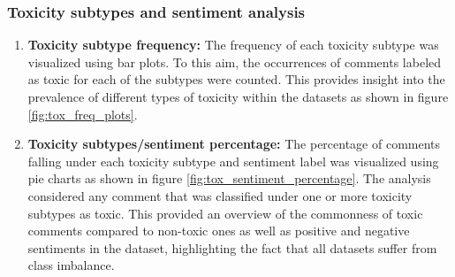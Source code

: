 \subsubsection{Toxicity subtypes and sentiment analysis}

\begin{enumerate}
    \item \textbf{Toxicity subtype frequency:} The frequency of each toxicity subtype was visualized using bar plots. To this aim, the occurrences of comments labeled as toxic for each of the subtypes were counted. This provides insight into the prevalence of different types of toxicity within the datasets as shown in figure \ref{fig:tox_freq_plots}.
    \item \textbf{Toxicity subtypes/sentiment percentage:} The percentage of comments falling under each toxicity subtype and sentiment label was visualized using pie charts as shown in figure \ref{fig:tox_sentiment_percentage}. The analysis considered any comment that was classified under one or more toxicity subtypes as toxic. This provided an overview of the commonness of toxic comments compared to non-toxic ones as well as positive and negative sentiments in the dataset, highlighting the fact that all datasets suffer from class imbalance.
\end{enumerate}

